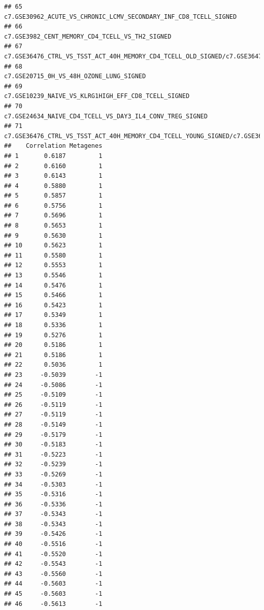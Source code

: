 \documentclass{article}\usepackage[]{graphicx}\usepackage[]{color}
\makeatletter
\newenvironment{kframe}{%
 \def\at@end@of@kframe{}%
 \ifinner\ifhmode%
  \def\at@end@of@kframe{\end{minipage}}%
  \begin{minipage}{\columnwidth}%
 \fi\fi%
 \def\FrameCommand##1{\hskip\@totalleftmargin \hskip-\fboxsep
 \colorbox{shadecolor}{##1}\hskip-\fboxsep
     \hskip-\linewidth \hskip-\@totalleftmargin \hskip\columnwidth}%
 \MakeFramed {\advance\hsize-\width
   \@totalleftmargin\z@ \linewidth\hsize
   \@setminipage}}%
 {\par\unskip\endMakeFramed%
 \at@end@of@kframe}
\newenvironment{knitrout}{}{} %
\makeatother
\begin{document}
\begin{knitrout}
\begin{kframe}
\begin{verbatim}
## 65                                                                                                                   c7.GSE30962_ACUTE_VS_CHRONIC_LCMV_SECONDARY_INF_CD8_TCELL_SIGNED
## 66                                                                                                                                     c7.GSE3982_CENT_MEMORY_CD4_TCELL_VS_TH2_SIGNED
## 67                                                          c7.GSE36476_CTRL_VS_TSST_ACT_40H_MEMORY_CD4_TCELL_OLD_SIGNED/c7.GSE36476_CTRL_VS_TSST_ACT_72H_MEMORY_CD4_TCELL_OLD_SIGNED
## 68                                                                                                                                            c7.GSE20715_0H_VS_48H_OZONE_LUNG_SIGNED
## 69                                                                                                                                c7.GSE10239_NAIVE_VS_KLRG1HIGH_EFF_CD8_TCELL_SIGNED
## 70                                                                                                                           c7.GSE24634_NAIVE_CD4_TCELL_VS_DAY3_IL4_CONV_TREG_SIGNED
## 71                                                      c7.GSE36476_CTRL_VS_TSST_ACT_40H_MEMORY_CD4_TCELL_YOUNG_SIGNED/c7.GSE36476_CTRL_VS_TSST_ACT_72H_MEMORY_CD4_TCELL_YOUNG_SIGNED
##    Correlation Metagenes
## 1       0.6187         1
## 2       0.6160         1
## 3       0.6143         1
## 4       0.5880         1
## 5       0.5857         1
## 6       0.5756         1
## 7       0.5696         1
## 8       0.5653         1
## 9       0.5630         1
## 10      0.5623         1
## 11      0.5580         1
## 12      0.5553         1
## 13      0.5546         1
## 14      0.5476         1
## 15      0.5466         1
## 16      0.5423         1
## 17      0.5349         1
## 18      0.5336         1
## 19      0.5276         1
## 20      0.5186         1
## 21      0.5186         1
## 22      0.5036         1
## 23     -0.5039        -1
## 24     -0.5086        -1
## 25     -0.5109        -1
## 26     -0.5119        -1
## 27     -0.5119        -1
## 28     -0.5149        -1
## 29     -0.5179        -1
## 30     -0.5183        -1
## 31     -0.5223        -1
## 32     -0.5239        -1
## 33     -0.5269        -1
## 34     -0.5303        -1
## 35     -0.5316        -1
## 36     -0.5336        -1
## 37     -0.5343        -1
## 38     -0.5343        -1
## 39     -0.5426        -1
## 40     -0.5516        -1
## 41     -0.5520        -1
## 42     -0.5543        -1
## 43     -0.5560        -1
## 44     -0.5603        -1
## 45     -0.5603        -1
## 46     -0.5613        -1

\end{verbatim}
\end{kframe}
\end{knitrout}
\end{document}
